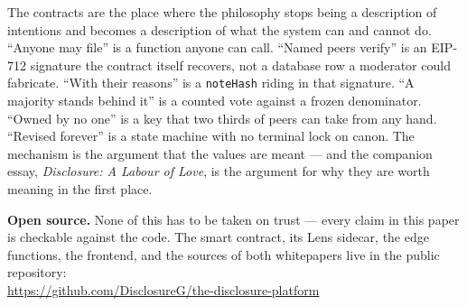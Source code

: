 \documentclass[11pt,a4paper]{article}
\begin{document}
The contracts are the place where the philosophy stops being a
description of intentions and becomes a description of what the system
can and cannot do. ``Anyone may file'' is a function anyone can call.
``Named peers verify'' is an EIP-712 signature the contract itself
recovers, not a database row a moderator could fabricate. ``With their
reasons'' is a \texttt{noteHash} riding in that signature. ``A majority
stands behind it'' is a counted vote against a frozen denominator.
``Owned by no one'' is a key that two thirds of peers can take from any
hand. ``Revised forever'' is a state machine with no terminal lock on
canon. The mechanism is the argument that the values are meant --- and
the companion essay, \emph{Disclosure: A Labour of Love}, is the
argument for why they are worth meaning in the first place.

\begin{notebox}
\textbf{Open source.} None of this has to be taken on trust --- every claim in
this paper is checkable against the code. The smart contract, its Lens
sidecar, the edge functions, the frontend, and the sources of both
whitepapers live in the public repository:\\[0.4em]
\centering\url{https://github.com/DisclosureG/the-disclosure-platform}
\end{notebox}
\end{document}
